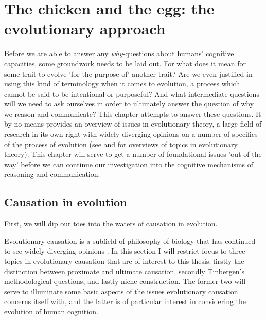 \chapter{The chicken and the egg: the evolutionary approach}
\label{ch:evolution}

Before we are able to answer any \emph{why}-questions about humans' cognitive capacities, some groundwork needs to be laid out. For what does it mean for some trait to evolve 'for the purpose of' another trait? Are we even justified in using this kind of terminology when it comes to evolution, a process which cannot be said to be intentional or purposeful? And what intermediate questions will we need to ask ourselves in order to ultimately answer the question of why we reason and communicate?
This chapter attempts to  answer these questions. It by no means provides an overview of issues in evolutionary theory, a large field of research in its own right with widely diverging opinions on a number of specifics of the process of evolution (see \citet{Ariew02} and \citet{UllerLaland19} for overviews of topics in evolutionary theory).
This chapter will serve to get a number of foundational issues 'out of the way' before we can continue our investigation into the cognitive mechanisms of reasoning and communication.

\section{Causation in evolution}
\label{sec:causation-evolution}

First, we will dip our toes into the waters of causation in evolution.

Evolutionary causation is a subfield of philosophy of biology that has continued to see widely diverging opinions \citep{Baedke2021, UllerLaland19}. In this section I will restrict focus to three topics in evolutionary causation that are of interest to this thesis: firstly the distinction between proximate and ultimate causation, secondly Tinbergen's methodological questions, and lastly niche construction.
The former two will serve to illuminate some basic aspects of the issues evolutionary causation concerns itself with, and the latter is of particular interest in considering the evolution of human cognition.

